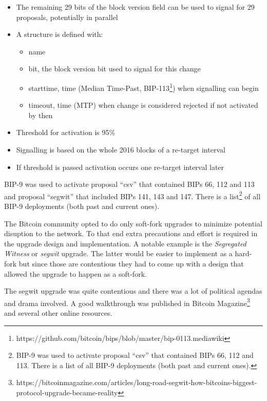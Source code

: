 \begin{itemize}
\item The remaining 29 bits of the block version field can be used to signal for 29 proposals, potentially in parallel
\item A structure is defined with:
	\begin{itemize}
	\item name
	\item bit, the block version bit used to signal for this change
	\item starttime, time (Median Time-Past, BIP-113\footnote{https://github.com/bitcoin/bips/blob/master/bip-0113.mediawiki}) when signalling can begin
	\item timeout, time (MTP) when change is considered rejected if not activated by then
	\end{itemize}
\item Threshold for activation is 95\%
\item Signalling is based on the whole 2016 blocks of a re-target interval
\item If threshold is passed activation occurs one re-target interval later
\end{itemize}

BIP-9 was used to activate proposal ``csv'' that contained BIPs 66, 112 and 113 and proposal ``segwit'' that included BIPs 141, 143 and 147. There is a list\footnote{BIP-9 was used to activate proposal “csv” that contained BIPs 66, 112 and 113. There is a list of all BIP-9 deployments (both past and current ones).} of all BIP-9 deployments (both past and current ones).

\begin{note}
The Bitcoin community opted to do only soft-fork upgrades to minimize potential disuption to the network. To that end extra precautions and effort is required in the upgrade design and implementation. A notable example is the \emph{Segregated Witness} or \emph{segwit} upgrade. The latter would be easier to implement as a hard-fork but since those are contentious they had to come up with a design that allowed the upgrade to happen as a soft-fork. 
\end{note}

The segwit upgrade was quite contentious and there was a lot of political agendas and drama involved. A good walkthrough was published in Bitcoin Magazine\footnote{https://bitcoinmagazine.com/articles/long-road-segwit-how-bitcoins-biggest-protocol-upgrade-became-reality} and several other online resources.


